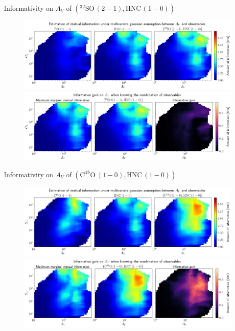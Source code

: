 \documentclass{beamer}
\begin{document}
\begin{frame}{Informativity on $A_V$ of $\left(\mathrm{^{32}SO\,(2-1)},\mathrm{HNC\,(1-0)}\right)$}
    \begin{figure}
        \centering
        \includegraphics[width=0.95\linewidth]{../linearinfo/av__32so21_hnc10_linearinfo.png}
        \vfill
        \includegraphics[width=0.95\linewidth]{../linearinfo/av__32so21_hnc10_linearinfo_gain.png}
    \end{figure}
\end{frame}

\begin{frame}{Informativity on $A_V$ of $\left(\mathrm{C^{18}O\,(1-0)},\mathrm{HNC\,(1-0)}\right)$}
    \begin{figure}
        \centering
        \includegraphics[width=0.95\linewidth]{../linearinfo/av__c18o10_hnc10_linearinfo.png}
        \vfill
        \includegraphics[width=0.95\linewidth]{../linearinfo/av__c18o10_hnc10_linearinfo_gain.png}
    \end{figure}
\end{frame}
\end{document}
